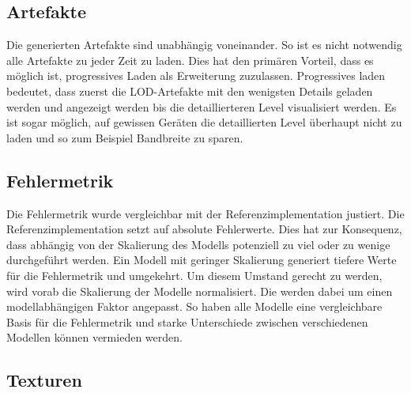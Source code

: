 \subsection{Artefakte}

Die generierten Artefakte sind unabhängig voneinander. So ist es nicht notwendig alle Artefakte zu jeder Zeit zu laden. Dies hat den primären Vorteil, dass es möglich ist, progressives Laden als Erweiterung zuzulassen. Progressives laden bedeutet, dass zuerst die LOD-Artefakte mit den wenigsten Details geladen werden und angezeigt werden bis die detaillierteren Level visualisiert werden.
Es ist sogar möglich, auf gewissen Geräten die detaillierten Level überhaupt nicht zu laden und so zum Beispiel Bandbreite zu sparen.

\subsection{Fehlermetrik}

Die Fehlermetrik wurde vergleichbar mit der Referenzimplementation justiert. Die Referenzimplementation setzt auf absolute Fehlerwerte. Dies hat zur Konsequenz, dass abhängig von der Skalierung des Modells potenziell zu viel oder zu wenige  durchgeführt werden. Ein Modell mit geringer Skalierung generiert tiefere Werte für die Fehlermetrik und umgekehrt. Um diesem Umstand gerecht zu werden, wird vorab die Skalierung der Modelle normalisiert. Die  werden dabei um einen modellabhängigen Faktor angepasst. So haben alle Modelle eine vergleichbare Basis für die Fehlermetrik und starke Unterschiede zwischen verschiedenen Modellen können vermieden werden.

\subsection{Texturen}

